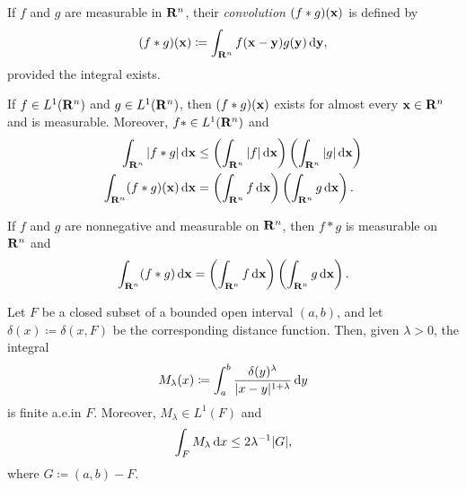 If $f$ and $g$ are measurable in $\mathbf{R}^n$, their \emph{convolution
  $(f*g)(\mathbf{x})$} is defined by
\[
(f*g)(\mathbf{x})\coloneqq\int_{\mathbf{R}^n}f(\mathbf{x}-\mathbf{y})g(\mathbf{y})\mathop{}\!\mathrm{d}\mathbf{y},
\]
provided the integral exists.
\begin{theorem*}[6.14]
If $f\in L^1(\mathbf{R}^n)$ and $g\in L^1(\mathbf{R}^n)$, then $(f*g)(\mathbf{x})$ exists for
almost every $\mathbf{x}\in\mathbf{R}^n$ and is measurable. Moreover, $f*\in
L^1(\mathbf{R}^n)$ and
\[
\begin{aligned}
\int_{\mathbf{R}^n}|f*g|\mathop{}\!\mathrm{d}\mathbf{x}
&\leq\left(\int_{\mathbf{R}^n}|f|\mathop{}\!\mathrm{d}\mathbf{x}\right)\left(\int_{\mathbf{R}^n}|g|\mathop{}\!\mathrm{d}\mathbf{x}\right)\\
\int_{\mathbf{R}^n}(f*g)(\mathbf{x})\mathop{}\!\mathrm{d}\mathbf{x}
&=\left(\int_{\mathbf{R}^n}f\mathop{}\!\mathrm{d}\mathbf{x}\right)\left(\int_{\mathbf{R}^n}g\mathop{}\!\mathrm{d}\mathbf{x}\right).
\end{aligned}
\]
\end{theorem*}
\begin{corollary*}[6.16]
If $f$ and $g$ are nonnegative and measurable on $\mathbf{R}^n$, then $f*g$ is
measurable on $\mathbf{R}^n$ and
\[
\int_{\mathbf{R}^n}(f*g)\mathop{}\!\mathrm{d}\mathbf{x}=
\left(\int_{\mathbf{R}^n} f\mathop{}\!\mathrm{d}\mathbf{x}\right)
\left(\int_{\mathbf{R}^n}g\mathop{}\!\mathrm{d}\mathbf{x}\right).
\]
\end{corollary*}
\begin{theorem*}[6.17, Marcinkiewicz]
Let $F$ be a closed subset of a bounded open interval $(a,b)$, and let
$\delta(x)\coloneqq\delta(x,F)$ be the corresponding distance
function. Then, given $\lambda>0$, the integral
\[
M_\lambda(x)\coloneqq\int_a^b\frac{\delta(y)^\lambda}{|x-y|^{1+\lambda}}\mathop{}\!\mathrm{d} y
\]
is finite a.e.\@ in $F$. Moreover, $M_\lambda\in L^1(F)$ and
\[
\int_F M_\lambda\mathop{}\!\mathrm{d} x\leq 2\lambda^{-1}|G|,
\]
where $G\coloneqq(a,b)\minus F$.
\end{theorem*}

